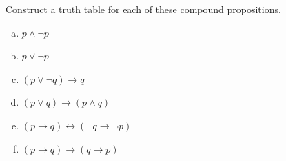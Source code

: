 \documentclass[a4paper,12pt,oneside,article]{memoir}
\begin{document}
\clearpage

\begin{tcolorbox}
	[colback=Emerald!10,colframe=cyan!40!black,title=\textbf{Question 33}]
	Construct a truth table for each of these compound propositions.
	\begin{enumerate}[a)]
		\item $p \land \lnot p $
		\item $p \lor \lnot p $
		\item $(p \lor \lnot q) \rightarrow q $
		\item $(p \lor q) \rightarrow (p \land q) $
		\item $(p \rightarrow q) \leftrightarrow (\lnot q \rightarrow \lnot p) $
		\item $ (p \rightarrow q) \rightarrow (q \rightarrow p) $
	\end{enumerate}
\end{tcolorbox}
\end{document}
